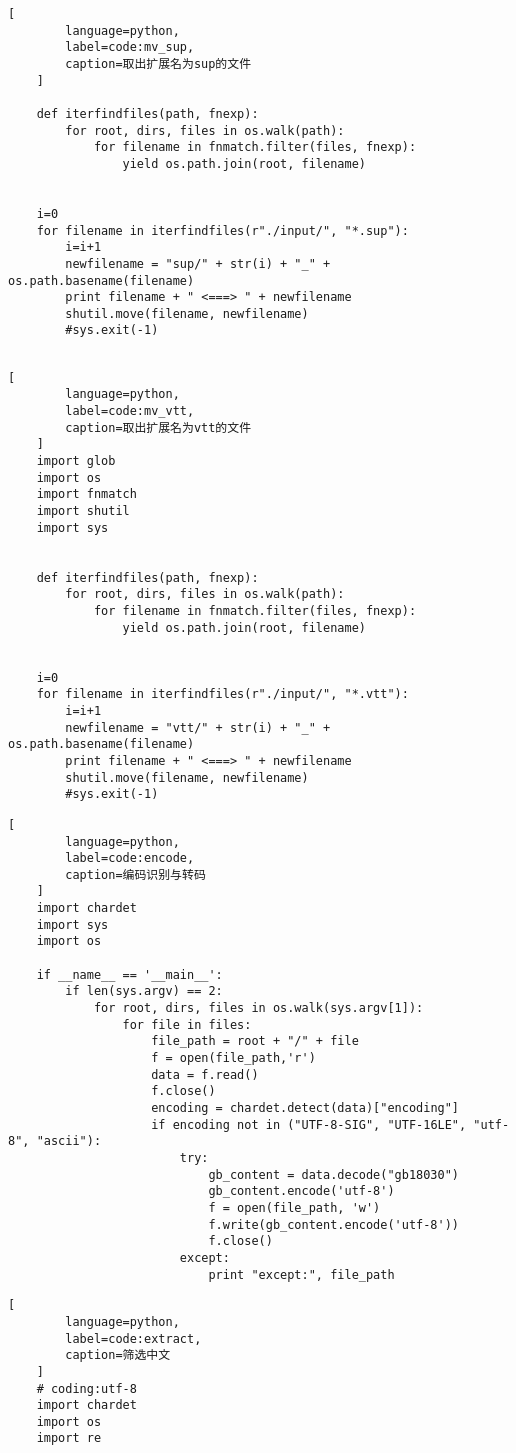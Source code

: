 \begin{appendices}
\begin{lstlisting}[
        language=python,
        label=code:mv_sup,
        caption=取出扩展名为sup的文件
    ]
    
    def iterfindfiles(path, fnexp):
        for root, dirs, files in os.walk(path):
            for filename in fnmatch.filter(files, fnexp):
                yield os.path.join(root, filename)
    
    
    i=0
    for filename in iterfindfiles(r"./input/", "*.sup"):
        i=i+1
        newfilename = "sup/" + str(i) + "_" + os.path.basename(filename)
        print filename + " <===> " + newfilename
        shutil.move(filename, newfilename)
        #sys.exit(-1)
    
    \end{lstlisting}
    \begin{lstlisting}[
        language=python,
        label=code:mv_vtt,
        caption=取出扩展名为vtt的文件
    ]
    import glob
    import os
    import fnmatch
    import shutil
    import sys
    
    
    def iterfindfiles(path, fnexp):
        for root, dirs, files in os.walk(path):
            for filename in fnmatch.filter(files, fnexp):
                yield os.path.join(root, filename)
    
    
    i=0
    for filename in iterfindfiles(r"./input/", "*.vtt"):
        i=i+1
        newfilename = "vtt/" + str(i) + "_" + os.path.basename(filename)
        print filename + " <===> " + newfilename
        shutil.move(filename, newfilename)
        #sys.exit(-1)
    \end{lstlisting}
    \begin{lstlisting}[
        language=python,
        label=code:encode,
        caption=编码识别与转码
    ]
    import chardet
    import sys
    import os
    
    if __name__ == '__main__':
        if len(sys.argv) == 2:
            for root, dirs, files in os.walk(sys.argv[1]):
                for file in files:
                    file_path = root + "/" + file
                    f = open(file_path,'r')
                    data = f.read()
                    f.close()
                    encoding = chardet.detect(data)["encoding"]
                    if encoding not in ("UTF-8-SIG", "UTF-16LE", "utf-8", "ascii"):
                        try:
                            gb_content = data.decode("gb18030")
                            gb_content.encode('utf-8')
                            f = open(file_path, 'w')
                            f.write(gb_content.encode('utf-8'))
                            f.close()
                        except:
                            print "except:", file_path
    \end{lstlisting}
    \begin{lstlisting}[
        language=python,
        label=code:extract,
        caption=筛选中文
    ]
    # coding:utf-8
    import chardet
    import os
    import re
    

\end{lstlisting}
\end{appendices}
